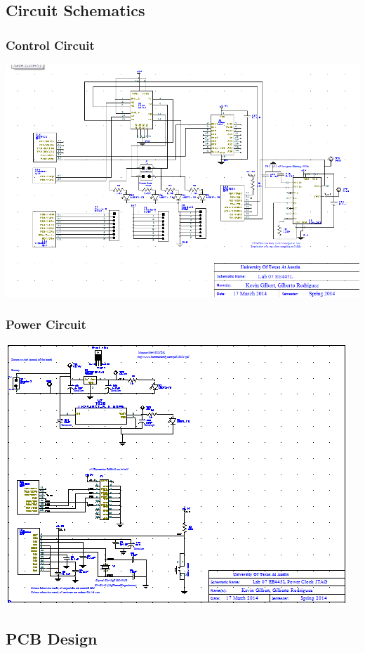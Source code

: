 \documentclass[twoside]{article}
\begin{document}
	\subsection{Circuit Schematics}
		\subsubsection{Control Circuit}
			\includegraphics[width=\textwidth]{circuitDiagram}
		\subsubsection{Power Circuit}
			\includegraphics[width=\textwidth]{powerCircuit}
            
    \subsection{PCB Design}
\end{document}
